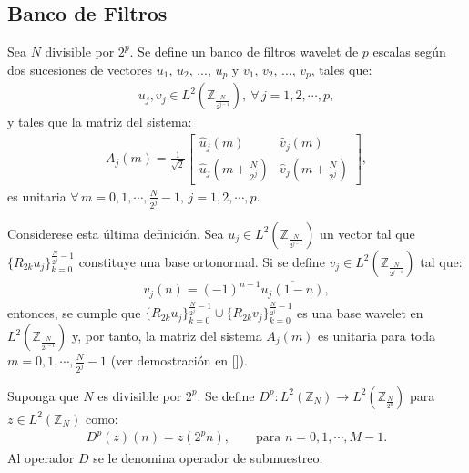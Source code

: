 \subsection{Banco de Filtros}

\begin{definition}
Sea $N$ divisible por $2^p$. Se define un banco de filtros wavelet de $p$ escalas seg\'un dos sucesiones de vectores $u_1$, $u_2$, ..., $u_p$ y $v_1$, $v_2$, ..., $v_p$, tales que:
\begin{eqnarray}
u_j, v_j \in L^2 \left(\mathbb{Z}_{\frac{N}{2^{j-1}}}\right),~\forall\,j=1,2,\cdots,p,\nonumber
\end{eqnarray}
y tales que la matriz del sistema:
\begin{eqnarray}
A_j(m) = \frac{1}{\sqrt{2}}\left[\begin{array}{cc}
\hat{u}_j(m)&\hat{v}_j(m)\\
\hat{u}_j\left(m+\frac{N}{2^j}\right)&\hat{v}_j\left(m+\frac{N}{2^j}\right)
\end{array}\right],\nonumber
\end{eqnarray}
es unitaria $\forall\,m=0,1,\cdots,\frac{N}{2^j}-1,\,j=1,2,\cdots,p$.
\label{banco-filtro}
\end{definition}

\par Considerese esta \'ultima definici\'on. Sea $u_j\in L^2\left(\mathbb{Z}_{\frac{N}{2^{j-1}}}\right)$ un vector tal que $\{R_{2k}u_j\}_{k=0}^{\frac{N}{2^j}-1}$ constituye una base ortonormal. Si se define $v_j\in L^2\left(\mathbb{Z}_{\frac{N}{2^{j-1}}}\right)$ tal que:
\begin{eqnarray}
v_j(n)=(-1)^{n-1}\overline{u_j(1-n)},\nonumber
\end{eqnarray}
entonces, se cumple que $\{R_{2k}u_j\}_{k=0}^{\frac{N}{2^j}-1} \cup \{R_{2k}v_j\}_{k=0}^{\frac{N}{2^j}-1}$ es una base wavelet en $L^2\left(\mathbb{Z}_{\frac{N}{2^{j-1}}}\right)$ y, por tanto, la matriz del sistema $A_j(m)$ es unitaria para toda $m=0,1,\cdots,\frac{N}{2^j}-1$ (ver demostraci\'on en [\textcolor{cyan}{\cite{8}}]).\\

\begin{definition}
Suponga que $N$ es divisible por $2^p$. Se define $D^p:L^2\left(\mathbb{Z}_N\right)\rightarrow L^2\left(\mathbb{Z}_{\frac{N}{2^p}}\right)$ para $z\in L^2\left(\mathbb{Z}_N\right)$ como:
\begin{eqnarray}
D^p(z)(n)=z(2^pn),\qquad\mbox{para $n=0,1,\cdots,M-1$.}\nonumber
\end{eqnarray}
Al operador $D$ se le denomina operador de submuestreo.
\end{definition}

